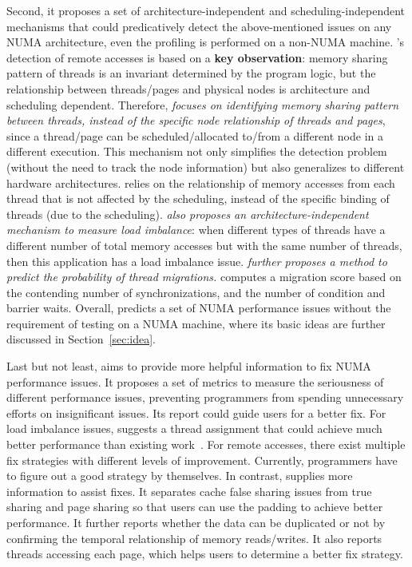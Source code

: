 Second, it proposes a set of architecture-independent and scheduling-independent mechanisms that could predicatively detect the above-mentioned issues on any NUMA architecture, even the profiling is performed on a non-NUMA machine. \NP{}'s detection of remote accesses is based on a \textbf{key observation}:  memory sharing pattern of threads is an invariant determined by the program logic, but the relationship between threads/pages and physical nodes is architecture and scheduling dependent. Therefore, \textit{\NP{} focuses on identifying memory sharing pattern between threads, instead of the specific node relationship of threads and pages}, since a thread/page can be scheduled/allocated to/from a different node in a different execution. This mechanism not only simplifies the detection problem (without the need to track the node information) but also generalizes to different hardware architectures.  \NP{} relies on the relationship of memory accesses from each thread that is not affected by the scheduling, instead of the specific binding of threads (due to the scheduling).  \textit{\NP{} also proposes an architecture-independent mechanism to measure load imbalance}: when different types of threads have a different number of total memory accesses but with the same number of threads, then this application has a load imbalance issue. \textit{\NP{} further proposes a method to predict the probability of thread migrations.} \NP{} computes a migration score based on the contending number of synchronizations, and the number of condition and barrier waits. Overall, \NP{} predicts a set of NUMA performance issues without the requirement of testing on a NUMA machine, where its basic ideas are further discussed in Section~\ref{sec:idea}.   

Last but not least, \NP{} aims to provide more helpful information to fix NUMA performance issues. It proposes a set of metrics to measure the seriousness of different performance issues, preventing programmers from spending unnecessary efforts on insignificant issues. Its report could guide users for a better fix. For load imbalance issues, \NP{} suggests a thread assignment that could achieve much better performance than  existing work~\cite{SyncPerf}. For remote accesses, there exist multiple fix strategies with different levels of improvement. Currently, programmers have to figure out a good strategy by themselves. In contrast, \NP{} supplies more information to assist fixes. It separates cache false sharing issues from true sharing and page sharing so that users can use the padding to achieve better performance. It further reports whether the data can be duplicated or not by confirming the temporal relationship of memory reads/writes. It also reports threads accessing each page, which helps users to determine a better fix strategy.  


